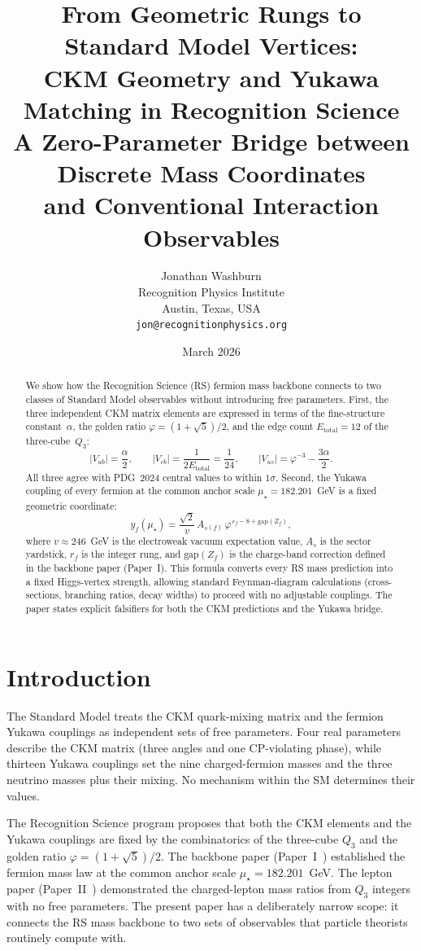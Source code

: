 \documentclass[11pt]{article}
\title{From Geometric Rungs to Standard Model Vertices:\\
CKM Geometry and Yukawa Matching in Recognition Science\\[6pt]
\large A Zero-Parameter Bridge between Discrete Mass Coordinates\\and Conventional Interaction Observables}
\author{Jonathan Washburn\\
Recognition Physics Institute\\
Austin, Texas, USA\\
\texttt{jon@recognitionphysics.org}}
\date{March 2026}
\theoremstyle{remark}
\newcommand{\phig}{\varphi}
\newcommand{\mustar}{\mu_\star}
\newcommand{\Etot}{E_{\mathrm{total}}}
\begin{document}
\maketitle

\begin{abstract}
We show how the Recognition Science (RS) fermion mass backbone connects
to two classes of Standard Model observables without introducing free
parameters.  First, the three independent CKM matrix elements are
expressed in terms of the fine-structure constant~$\alpha$, the
golden ratio $\phig=(1+\sqrt{5})/2$, and the edge count $\Etot=12$
of the three-cube~$Q_3$:
\[
  |V_{ub}| = \frac{\alpha}{2},
  \qquad
  |V_{cb}| = \frac{1}{2\Etot} = \frac{1}{24},
  \qquad
  |V_{us}| = \phig^{-3} - \frac{3\alpha}{2}.
\]
All three agree with PDG~2024 central values to within $1\sigma$.
Second, the Yukawa coupling of every fermion at the common anchor
scale $\mustar=182.201$~GeV is a fixed geometric coordinate:
\[
  y_f(\mustar)
  = \frac{\sqrt{2}}{v}\,
    A_{s(f)}\,\phig^{\,r_f - 8 + \mathrm{gap}(Z_f)},
\]
where $v\approx 246$~GeV is the electroweak vacuum expectation value,
$A_s$ is the sector yardstick, $r_f$ is the integer rung,
and $\mathrm{gap}(Z_f)$ is the charge-band correction defined in
the backbone paper (Paper~I).  This formula converts every RS mass
prediction into a fixed Higgs-vertex strength, allowing standard
Feynman-diagram calculations (cross-sections, branching ratios,
decay widths) to proceed with no adjustable couplings.
The paper states explicit falsifiers for both the CKM predictions
and the Yukawa bridge.
\end{abstract}

\section{Introduction}

The Standard Model treats the CKM quark-mixing matrix and the
fermion Yukawa couplings as independent sets of free parameters.
Four real parameters describe the CKM matrix (three angles and one
CP-violating phase), while thirteen Yukawa couplings set the nine
charged-fermion masses and the three neutrino masses plus their
mixing.  No mechanism within the SM determines their values.

The Recognition Science program proposes that both the CKM elements
and the Yukawa couplings are fixed by the combinatorics of the
three-cube $Q_3$ and the golden ratio $\phig=(1+\sqrt{5})/2$.
The backbone paper (Paper~I~\cite{backbone}) established the
fermion mass law at the common anchor scale $\mustar=182.201$~GeV.
The lepton paper (Paper~II~\cite{leptons}) demonstrated the
charged-lepton mass ratios from $Q_3$ integers with no free
parameters.  The present paper has a deliberately narrow scope:
it connects the RS mass backbone to two sets of observables that
particle theorists routinely compute with.
\end{document}
